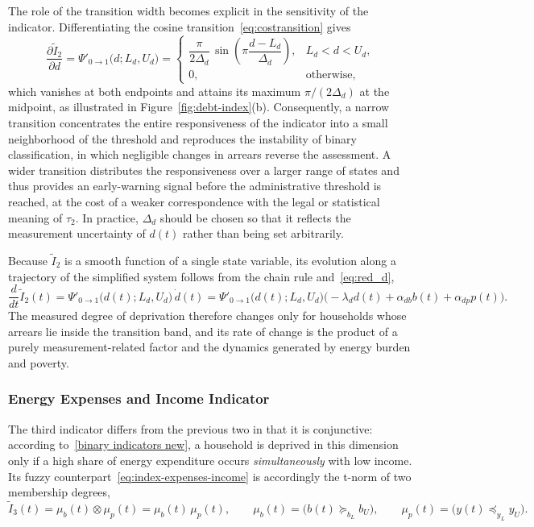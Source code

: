\documentclass[11pt,a4paper]{article}
\begin{document}
The role of the transition width becomes explicit in the sensitivity of the indicator. Differentiating the cosine transition~\eqref{eq:costransition} gives
\begin{equation}\label{eq:dpsi}
\frac{\partial\widetilde I_2}{\partial d}
=
\Psi'_{0\to1}\bigl(d;L_d,U_d\bigr)
=
\begin{cases}
\dfrac{\pi}{2\Delta_d}\,
\sin\!\left(\pi\dfrac{d-L_d}{\Delta_d}\right), & L_d<d<U_d,\\[10pt]
0, & \text{otherwise},
\end{cases}
\end{equation}
which vanishes at both endpoints and attains its maximum \(\pi/(2\Delta_d)\) at the midpoint, as illustrated in Figure~\ref{fig:debt-index}(b). Consequently, a narrow transition concentrates the entire responsiveness of the indicator into a small neighborhood of the threshold and reproduces the instability of binary classification, in which negligible changes in arrears reverse the assessment. A wider transition distributes the responsiveness over a larger range of states and thus provides an early-warning signal before the administrative threshold is reached, at the cost of a weaker correspondence with the legal or statistical meaning of \(\tau_2\). In practice, \(\Delta_d\) should be chosen so that it reflects the measurement uncertainty of \(d(t)\) rather than being set arbitrarily.

Because \(\widetilde I_2\) is a smooth function of a single state variable, its evolution along a trajectory of the simplified system follows from the chain rule and~\eqref{eq:red_d},
\begin{equation}\label{eq:I2dot}
\frac{d}{dt}\widetilde I_2(t)
=
\Psi'_{0\to1}\bigl(d(t);L_d,U_d\bigr)\,\dot d(t)
=
\Psi'_{0\to1}\bigl(d(t);L_d,U_d\bigr)
\bigl(-\lambda_d d(t)+\alpha_{db}b(t)+\alpha_{dp}p(t)\bigr).
\end{equation}
The measured degree of deprivation therefore changes only for households whose arrears lie inside the transition band, and its rate of change is the product of a purely measurement-related factor and the dynamics generated by energy burden and poverty.

\subsubsection{Energy Expenses and Income Indicator}\label{sec:expenses-income}

The third indicator differs from the previous two in that it is conjunctive: according to~\eqref{binary indicators new}, a household is deprived in this dimension only if a high share of energy expenditure occurs \emph{simultaneously} with low income. Its fuzzy counterpart~\eqref{eq:index-expenses-income} is accordingly the t-norm of two membership degrees,
\[
\widetilde I_3(t)=\mu_b(t)\otimes\mu_p(t)=\mu_b(t)\,\mu_p(t),
\qquad
\mu_b(t)=\bigl(b(t)\succeq_{b_L}b_U\bigr),
\qquad
\mu_p(t)=\bigl(y(t)\preceq_{y_L}y_U\bigr).
\]
\end{document}
